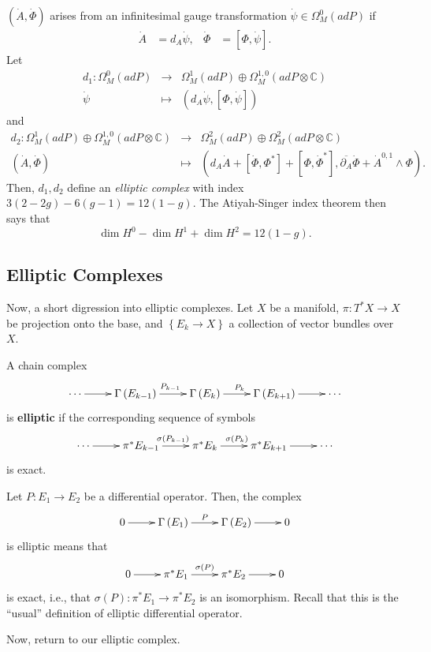 $\left(\dot{A},\dot{\Phi}\right)$ arises from an infinitesimal gauge
transformation $\dot{\psi}\in\Omega_{M}^{0}\left(adP\right)$ if
\begin{align*}
\dot{A} & =d_{A}\dot{\psi}, & \dot{\Phi} & =\left[\Phi,\dot{\psi}\right].
\end{align*}
Let
\begin{eqnarray*}
d_{1}:\Omega_{M}^{0}\left(adP\right) & \longrightarrow & \Omega_{M}^{1}\left(adP\right)\oplus\Omega_{M}^{1,0}\left(adP\otimes\mathbb{C}\right)\\
\dot{\psi} & \mapsto & \left(d_{A}\dot{\psi},\left[\Phi,\dot{\psi}\right]\right)
\end{eqnarray*}
and
\begin{eqnarray*}
d_{2}:\Omega_{M}^{1}\left(adP\right)\oplus\Omega_{M}^{1,0}\left(adP\otimes\mathbb{C}\right) & \longrightarrow &
\Omega_{M}^{2}\left(adP\right)\oplus\Omega_{M}^{2}\left(adP\otimes\mathbb{C}\right)\\
\left(\dot{A},\dot{\Phi}\right) & \mapsto &
\left(d_{A}\dot{A}+\left[\dot{\Phi},\Phi^{*}\right]+\left[\Phi,\dot{\Phi}^{*}\right],\overline{\partial_{A}}\dot{\Phi}+\dot{A}^{0,1}\wedge\Phi\right).
\end{eqnarray*}
Then, $d_{1},d_{2}$ define an \emph{elliptic complex} with index
$3\left(2-2g\right)-6\left(g-1\right)=12\left(1-g\right)$. The Atiyah-Singer
index theorem then says that
\[
\dim H^{0}-\dim H^{1}+\dim H^{2}=12\left(1-g\right).
\]



\subsection{Elliptic Complexes}

Now, a short digression into elliptic complexes. Let $X$ be a manifold,
$\pi:T^{*}X\rightarrow X$ be projection onto the base, and $\left\{ E_{k}\rightarrow X\right\} $
a collection of vector bundles over $X$.
\begin{defn}
A chain complex
\[
\xymatrix{\cdots\ar[r] & \Gamma\left(E_{k-1}\right)\ar[r]^{P_{k-1}} & \Gamma\left(E_{k}\right)\ar[r]^{P_{k}} & \Gamma\left(E_{k+1}\right)\ar[r] & \cdots}
\]
is \textbf{elliptic} if the corresponding sequence of symbols
\[
\xymatrix{\cdots\ar[r] & \pi^{*}E_{k-1}\ar[r]^{\sigma\left(P_{k-1}\right)} & \pi^{*}E_{k}\ar[r]^{\sigma\left(P_{k}\right)} & \pi^{*}E_{k+1}\ar[r] & \cdots}
\]
is exact.\end{defn}
\begin{example*}
Let $P:E_{1}\rightarrow E_{2}$ be a differential operator. Then,
the complex
\[
\xymatrix{0\ar[r] & \Gamma\left(E_{1}\right)\ar[r]^{P} & \Gamma\left(E_{2}\right)\ar[r] & 0}
\]
is elliptic means that
\[
\xymatrix{0\ar[r] & \pi^{*}E_{1}\ar[r]^{\sigma\left(P\right)} & \pi^{*}E_{2}\ar[r] & 0}
\]
is exact, i.e., that $\sigma\left(P\right):\pi^{*}E_{1}\rightarrow\pi^{*}E_{2}$
is an isomorphism. Recall that this is the ``usual'' definition
of elliptic differential operator.
\end{example*}
Now, return to our elliptic complex.

